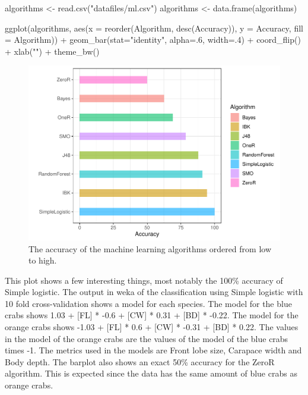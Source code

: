 \documentclass[
]{article}
\newenvironment{Shaded}{}{}
\newcommand{\AttributeTok}[1]{#1}
\newcommand{\DecValTok}[1]{#1}
\newcommand{\FunctionTok}[1]{#1}
\newcommand{\NormalTok}[1]{#1}
\newcommand{\OtherTok}[1]{\textcolor[rgb]{1.00,0.25,0.00}{#1}}
\newcommand{\SpecialCharTok}[1]{\textcolor[rgb]{0.00,0.50,0.50}{#1}}
\newcommand{\StringTok}[1]{\textcolor[rgb]{0.00,0.50,0.50}{#1}}
\begin{document}
\begin{Shaded}
\begin{Highlighting}[]
\NormalTok{algorithms }\OtherTok{\textless{}{-}} \FunctionTok{read.csv}\NormalTok{(}\StringTok{"datafiles/ml.csv"}\NormalTok{)}
\NormalTok{algorithms }\OtherTok{\textless{}{-}} \FunctionTok{data.frame}\NormalTok{(algorithms)}

\FunctionTok{ggplot}\NormalTok{(algorithms, }\FunctionTok{aes}\NormalTok{(}\AttributeTok{x =} \FunctionTok{reorder}\NormalTok{(Algorithm, }\FunctionTok{desc}\NormalTok{(Accuracy)), }\AttributeTok{y =}\NormalTok{ Accuracy, }\AttributeTok{fill =}\NormalTok{ Algorithm)) }\SpecialCharTok{+}
  \FunctionTok{geom\_bar}\NormalTok{(}\AttributeTok{stat=}\StringTok{"identity"}\NormalTok{, }\AttributeTok{alpha=}\NormalTok{.}\DecValTok{6}\NormalTok{, }\AttributeTok{width=}\NormalTok{.}\DecValTok{4}\NormalTok{) }\SpecialCharTok{+}
  \FunctionTok{coord\_flip}\NormalTok{() }\SpecialCharTok{+}
  \FunctionTok{xlab}\NormalTok{(}\StringTok{""}\NormalTok{) }\SpecialCharTok{+}
  \FunctionTok{theme\_bw}\NormalTok{()}
\end{Highlighting}
\end{Shaded}

\begin{figure}[H]

{\centering \includegraphics{Log_files/figure-latex/ml-1} 

}

\caption{The accuracy of the machine learning algorithms ordered from low to high.}\label{fig:ml}
\end{figure}

This plot shows a few interesting things, most notably the 100\%
accuracy of Simple logistic. The output in weka of the classification
using Simple logistic with 10 fold cross-validation shows a model for
each species. The model for the blue crabs shows 1.03 + {[}FL{]} * -0.6
+ {[}CW{]} * 0.31 + {[}BD{]} * -0.22. The model for the orange crabs
shows -1.03 + {[}FL{]} * 0.6 + {[}CW{]} * -0.31 + {[}BD{]} * 0.22. The
values in the model of the orange crabs are the values of the model of
the blue crabs times -1. The metrics used in the models are Front lobe
size, Carapace width and Body depth. The barplot also shows an exact
50\% accuracy for the ZeroR algorithm. This is expected since the data
has the same amount of blue crabs as orange crabs.
\end{document}
